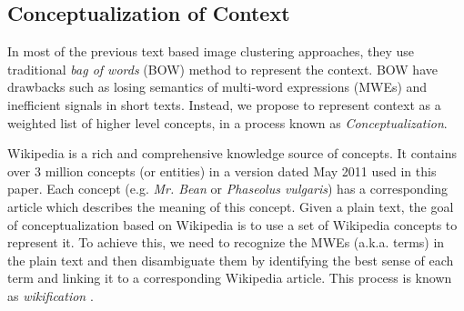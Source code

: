 \subsection{Conceptualization of Context}

In most of the previous text based image clustering approaches, they use traditional
\emph{bag of words} (BOW) method to represent the context. BOW have drawbacks such as
losing semantics of multi-word expressions (MWEs) and inefficient signals in short texts.
Instead, we propose to represent context as a weighted list of higher level concepts,
in a process known as \emph{Conceptualization}.


Wikipedia is a rich and comprehensive knowledge source of concepts.
It contains over 3 million concepts (or entities) in a version dated May 2011 used
in this paper.
Each concept (e.g. {\em Mr. Bean} or {\em Phaseolus vulgaris}) has a corresponding article
which describes the meaning of this concept.
Given a plain text, the goal of conceptualization based on Wikipedia is to use a set of
Wikipedia concepts to represent it. To achieve this, we need to recognize the MWEs
(a.k.a. terms) in the plain text and then disambiguate them
by identifying the best sense of each
term and linking it to a corresponding Wikipedia article. This process is known as
\emph{wikification} \cite{MihalceaC07}. %
%


